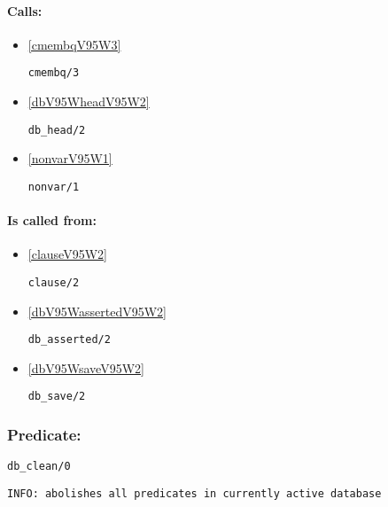 \paragraph{Calls:} 
\begin{itemize}
\item \ref{cmembqV95W3} 
\begin{verbatim}
cmembq/3
\end{verbatim}

\item \ref{dbV95WheadV95W2} 
\begin{verbatim}
db_head/2
\end{verbatim}

\item \ref{nonvarV95W1} 
\begin{verbatim}
nonvar/1
\end{verbatim}

\end{itemize}
\paragraph{Is called from:} 
\begin{itemize}
\item \ref{clauseV95W2} 
\begin{verbatim}
clause/2
\end{verbatim}

\item \ref{dbV95WassertedV95W2} 
\begin{verbatim}
db_asserted/2
\end{verbatim}

\item \ref{dbV95WsaveV95W2} 
\begin{verbatim}
db_save/2
\end{verbatim}

\end{itemize}

\subsubsection{Predicate:} \label{dbV95WcleanV95W0}

\begin{verbatim}
db_clean/0
\end{verbatim}

{\small \begin{verbatim}
INFO: abolishes all predicates in currently active database

\end{verbatim}}
